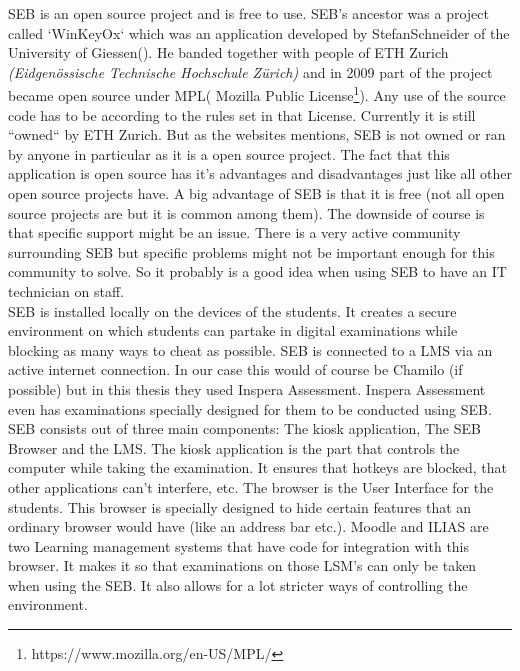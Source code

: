 SEB is an open source project and is free to use. SEB's ancestor was a project called `WinKeyOx` which was an application developed by StefanSchneider of the University of Giessen(\textcite{SEBfaq}). He banded together with people of ETH Zurich \textit{(Eidgenössische Technische Hochschule Zürich)} and in 2009 part of the project became open source under MPL( Mozilla Public License\footnote{https://www.mozilla.org/en-US/MPL/}). Any use of the source code has to be according to the rules set in that License. Currently it is still ``owned`` by ETH Zurich. But as the websites mentions, SEB is not owned or ran by anyone in particular as it is a open source project.
The fact that this application is open source has it's advantages and disadvantages just like all other open source projects have. A big advantage of SEB is that it is free (not all open source projects are but it is common among them). The downside of course is that specific support might be an issue. There is a very active community surrounding SEB but specific problems might not be important enough for this community to solve. So it probably is a good idea when using SEB to have an IT technician on staff.\\

SEB is installed locally on the devices of the students. It creates a secure environment on which students can partake in digital examinations while blocking as many ways to cheat as possible. SEB is connected to a LMS via an active internet connection. In our case this would of course be Chamilo (if possible) but in this thesis they used Inspera Assessment. Inspera Assessment even has examinations specially designed for them to be conducted using SEB.
SEB consists out of three main components: The kiosk application, The SEB Browser and the LMS. The kiosk application is the part that controls the computer while taking the examination. It ensures that hotkeys are blocked, that other applications can't interfere, etc. 
The browser is the User Interface for the students. This browser is specially designed to hide certain features that an ordinary browser would have (like an address bar etc.). Moodle and ILIAS are two Learning management systems that have code for integration with this browser. It makes it so that examinations on those LSM's can only be taken when using the SEB. It also allows for a lot stricter ways of controlling the environment. \\

